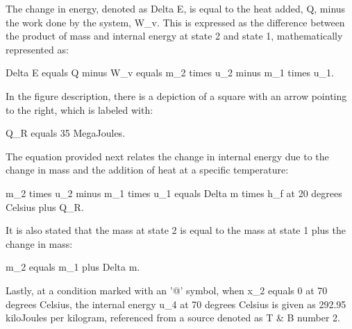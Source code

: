 The change in energy, denoted as Delta E, is equal to the heat added, Q, minus the work done by the system, W_v. This is expressed as the difference between the product of mass and internal energy at state 2 and state 1, mathematically represented as:

Delta E equals Q minus W_v equals m_2 times u_2 minus m_1 times u_1.

In the figure description, there is a depiction of a square with an arrow pointing to the right, which is labeled with:

Q_R equals 35 MegaJoules.

The equation provided next relates the change in internal energy due to the change in mass and the addition of heat at a specific temperature:

m_2 times u_2 minus m_1 times u_1 equals Delta m times h_f at 20 degrees Celsius plus Q_R.

It is also stated that the mass at state 2 is equal to the mass at state 1 plus the change in mass:

m_2 equals m_1 plus Delta m.

Lastly, at a condition marked with an '@' symbol, when x_2 equals 0 at 70 degrees Celsius, the internal energy u_4 at 70 degrees Celsius is given as 292.95 kiloJoules per kilogram, referenced from a source denoted as T & B number 2.
